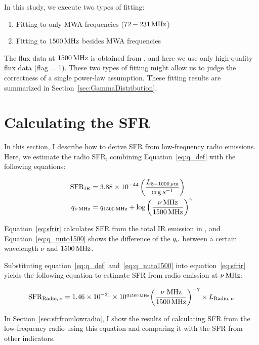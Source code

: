 In this study, we execute two types of fitting:

\begin{enumerate}
    \item Fitting to only MWA frequencies ($72-231\,\mathrm{MHz}$)
    \item Fitting to $1500\,\mathrm{MHz}$ besides MWA frequencies
\end{enumerate}

The flux data at $1500\,\mathrm{MHz}$ is obtained from \citet{Boselli2015}, and here we use only high-quality flux data (flag = 1).
These two types of fitting might allow us to judge the correctness of a single power-law assumption.
These fitting results are summarized in Section~\ref{sec:GammaDistribution}.



\section{Calculating the SFR}\label{sec:calculatingsfr}
In this section, I describe how to derive SFR from low-frequency radio emissions.\\
Here, we estimate the radio SFR, combining Equation~\ref{eq:q_def} with the following equations:

\begin{align}
    \mathrm{SFR}_{\mathrm{IR}} &= 3.88 \times 10^{-44}\left(\frac{L_{\mathrm{8-1000\,\mu m}}}{\mathrm{erg}\,s^{-1}}\right)\label{eq:sfrir}\\
    q_{\nu\,\mathrm{MHz}} &= q_{\mathrm{1500\,\mathrm{MHz}}} + \log{\left(\frac{\nu\,\mathrm{MHz}}{1500\,\mathrm{MHz}}\right)}^{\gamma}\label{eq:q_nuto1500}
\end{align}

Equation~\ref{eq:sfrir} calculates SFR from the total IR emission in \citet{Murphy2011}, and Equation~\ref{eq:q_nuto1500} shows the difference of the $q_{\nu}$ between a certain wavelength $\nu$ and $1500\,\mathrm{MHz}$.

Substituting equation~\ref{eq:q_def} and~\ref{eq:q_nuto1500} into equation~\ref{eq:sfrir} yields the following equation to estimate SFR from radio emission at $\nu\,\mathrm{MHz}$:

\begin{equation}\label{eq:sfrfromradio}
    \mathrm{SFR}_{\mathrm{Radio},\,\nu} = 1.46\times10^{-31}\times 10^{q_{\mathrm{1500\,\mathrm{MHz}}}} {\left(\frac{\nu\,\,\mathrm{MHz}}{1500\,\mathrm{MHz}}\right)}^{-\gamma} \times L_{\mathrm{Radio},\,\nu}
\end{equation}

In Section~\ref{sec:sfrfromlowradio}, I show the results of calculating SFR from the low-frequency radio using this equation and comparing it with the SFR from other indicators.



%
%
